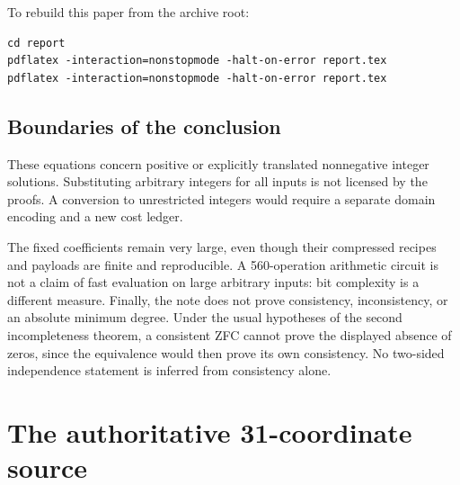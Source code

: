 \documentclass[11pt]{article}
\theoremstyle{remark}\newtheorem{remark}[theorem]{Remark}
\begin{document}
To rebuild this paper from the archive root:
\begin{verbatim}
cd report
pdflatex -interaction=nonstopmode -halt-on-error report.tex
pdflatex -interaction=nonstopmode -halt-on-error report.tex
\end{verbatim}

\subsection{Boundaries of the conclusion}

These equations concern positive or explicitly translated nonnegative
integer solutions. Substituting arbitrary integers for all inputs is not
licensed by the proofs. A conversion to unrestricted integers would
require a separate domain encoding and a new cost ledger.

The fixed coefficients remain very large, even though their compressed
recipes and payloads are finite and reproducible. A 560-operation
arithmetic circuit is not a claim of fast evaluation on large arbitrary
inputs: bit complexity is a different measure. Finally, the note does
not prove consistency, inconsistency, or an absolute minimum degree.
Under the usual hypotheses of the second incompleteness theorem, a
consistent ZFC cannot prove the displayed absence of zeros, since the
equivalence would then prove its own consistency. No two-sided
independence statement is inferred from consistency alone.

\appendix


\section{The authoritative 31-coordinate source}\label{app:source}
\end{document}
